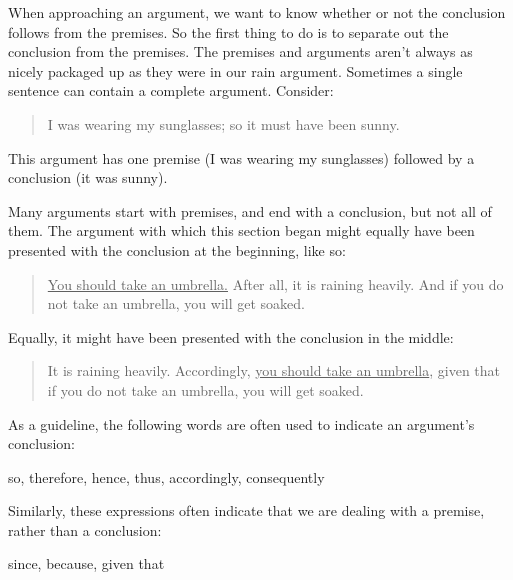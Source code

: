 When approaching an argument, we want to know whether or not the conclusion follows from the premises. So the first thing to do is to separate out the conclusion from the premises. The premises and arguments aren't always as nicely packaged up as they were in our rain argument. Sometimes a single sentence can contain a complete argument. Consider:
	\begin{quote}
		 I was wearing my sunglasses; so it must have been sunny.
	\end{quote}
This argument has one premise (I was wearing my sunglasses) followed by a conclusion (it was sunny). 

Many arguments start with premises, and end with a conclusion, but not all of them. The argument with which this section began might equally have been presented with the conclusion at the beginning, like so:
	\begin{quote}
		\underline{You should take an umbrella.} After all, it is raining heavily. And if you do not take an umbrella, you will get soaked. 
	\end{quote}
Equally, it might have been presented with the conclusion in the middle:
	\begin{quote}
		It is raining heavily. Accordingly, \underline{you should take an umbrella}, given that if you do not take an umbrella, you will get soaked.
	\end{quote}

 As a guideline, the following words are often used to indicate an argument's conclusion:
	\begin{center}
		so, therefore, hence, thus, accordingly, consequently
	\end{center}
Similarly, these expressions often indicate that we are dealing with a premise, rather than a conclusion:
	\begin{center}
		since, because, given that
	\end{center}



